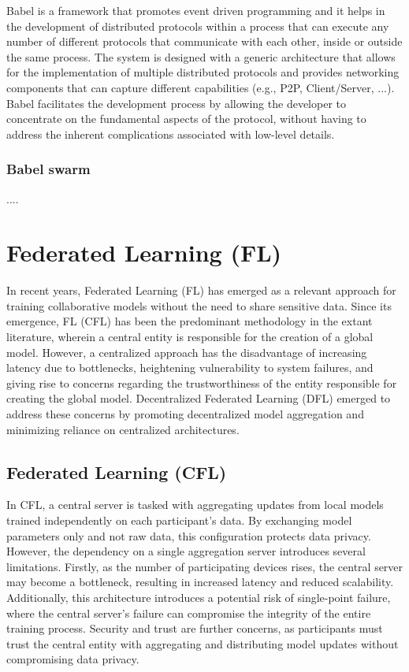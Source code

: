 Babel is a framework that promotes event driven programming and it helps in the development of distributed protocols within a process that can execute any number of different protocols that communicate with each other, inside or outside the same process. The system is designed with a generic architecture that allows for the implementation of multiple distributed protocols and provides networking components that can capture different capabilities (e.g., \gls{P2P}, Client/Server, ...). 
Babel facilitates the development process by allowing the developer to concentrate on the fundamental aspects of the protocol, without having to address the inherent complications associated with low-level details.

\subsubsection{Babel swarm}
\label{sec:babel_swarm}

....


\section{Federated Learning (FL)}
\label{sec:federated_laerning}

In recent years, Federated Learning (FL) has emerged as a relevant approach for training collaborative models without the need to share sensitive data. Since its emergence, \gls{FL} (\gls{CFL}) has been the predominant methodology in the extant literature, wherein a central entity is responsible for the creation of a global model. However, a centralized approach has the disadvantage of increasing latency due to bottlenecks, heightening vulnerability to system failures, and giving rise to concerns regarding the trustworthiness of the entity responsible for creating the global model. Decentralized Federated Learning (DFL) emerged to address these concerns by promoting decentralized model aggregation and minimizing reliance on centralized architectures.

\subsection{Federated Learning (CFL)}
\label{sub:federated_learning}

In CFL, a central server is tasked with aggregating updates from local models trained independently on each participant’s data. By exchanging model parameters only and not raw data, this configuration protects data privacy. However, the dependency on a single aggregation server introduces several limitations. Firstly, as the number of participating devices rises, the central server may become a bottleneck, resulting in increased latency and reduced scalability. Additionally, this architecture introduces a potential risk of single-point failure, where the central server’s failure can compromise the integrity of the entire training process. Security and trust are further concerns, as participants must trust the central entity with aggregating and distributing model updates without compromising data privacy.

